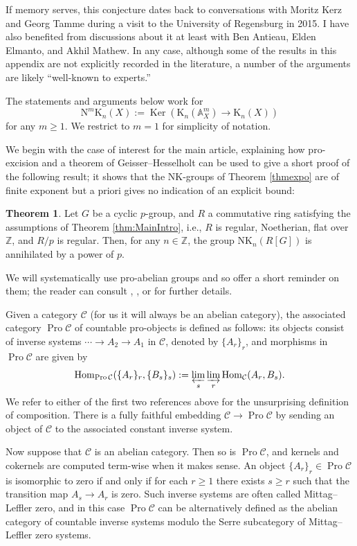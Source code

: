 \documentclass[reqno,11pt,letterpaper]{amsart}
\theoremstyle{plain}
\numberwithin{equation}{subsection}
\newtheorem{theorem}[equation]{Theorem}
\theoremstyle{remark}
\theoremstyle{plain}
\theoremstyle{definition}\newtheorem*{notation}{Notation}
\newcommand{\bbA}{{\mathbb A}}
\newcommand{\cal}{\mathcal}
\newcommand{\Hom}{{\rm Hom}}
\newcommand{\op}{\operatorname}
\renewcommand{\cal}{\mathcal}
\newcommand{\indlim}{\varinjlim}
\newtheorem{theorem}{Theorem}
\newcommand{\RK}{\mathrm{K}}
\newcommand{\NK}{\mathrm{NK}}
\newcommand{\BZ}{\mathbb{Z}}
\begin{document}
If memory serves, this conjecture dates back to conversations with Moritz Kerz and Georg Tamme during a visit to the University of Regensburg in 2015. I have also benefited from discussions about it at least with Ben Antieau, Elden Elmanto, and Akhil Mathew. In any case, although some of the results in this appendix are not explicitly recorded in the literature, a number of the arguments are likely ``well-known to experts.''

The statements and arguments below work for \[\mathrm{N}^m\RK_n(X):=\op{Ker}(\RK_n(\bbA_X^m)\to \RK_n(X))\] for any $m\ge 1$. We restrict to $m=1$ for simplicity of notation.

We begin with the case of interest for the main article, explaining how pro-excision and a theorem of Geisser--Hesselholt can be used to give a short proof of the following result; it shows that the NK-groups of Theorem \ref{thmexpo} are of finite exponent but a priori gives no indication of an explicit bound:

\begin{theorem}\label{thm1_app}
Let $G$ be a cyclic $p$-group, and $R$ a commutative ring satisfying the assumptions of Theorem \ref{thm:MainIntro}, i.e., $R$ is regular, Noetherian, flat over $\BZ$, and $R/p$ is regular. Then, for any $n\in\BZ$, the group $\NK_n(R[G])$ is annihilated by a power of $p$.
\end{theorem}

We will systematically use pro-abelian groups and so offer a short reminder on them; the reader can consult \cite{ArtinMazur1969}, \cite{Isaksen2002}, or \cite{Morrowpro2} for further details.

Given a category $\cal C$ (for us it will always be an abelian category), the associated category $\op{Pro}\cal C$ of countable pro-objects is defined as follows: its objects consist of inverse systems $\cdots\to A_2\to A_1$ in $\cal C$, denoted by $\{A_r\}_r$, and morphisms in $\op{Pro}\cal C$ are given by \[\Hom_{\op{Pro}\cal C}(\{A_r\}_r,\{B_s\}_s):=\varprojlim_s\indlim_r\Hom_{\cal C}(A_r,B_s).\] We refer to either of the first two references above for the unsurprising definition of composition. There is a fully faithful embedding $\cal C\to\op{Pro}\cal C$ by sending an object of $\cal C$ to the associated constant inverse system.

Now suppose that $\cal C$ is an abelian category. Then so is $\op{Pro}\cal C$, and kernels and cokernels are computed term-wise when it makes sense. An object $\{A_r\}_r\in\op{Pro}\cal C$ is isomorphic to zero if and only if for each $r\ge 1$ there exists $s\ge r$ such that the transition map $A_s\to A_r$ is zero. Such inverse systems are often called Mittag--Leffler zero, and in this case $\op{Pro}\cal C$ can be alternatively defined as the abelian category of countable inverse systems modulo the Serre subcategory of Mittag--Leffler zero systems.
\end{document}
